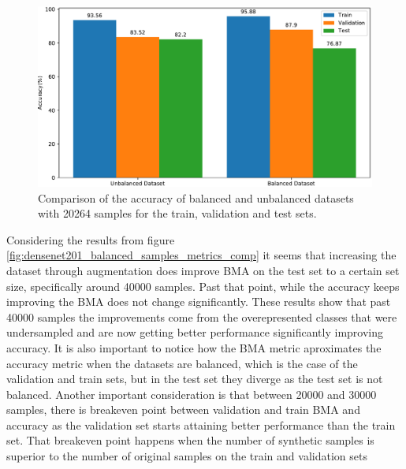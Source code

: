     \begin{figure}[ht]
        \centering
        \includegraphics[width=\textwidth]{figs/densenet201_acc_comp.pdf}
        \caption{Comparison of the accuracy of balanced and unbalanced datasets with 20264 samples for the train, validation and test sets.}
        \label{fig:densenet201_acc_comp}
    \end{figure}
    
    Considering the results from figure \ref{fig:densenet201_balanced_samples_metrics_comp} it seems that increasing the dataset through augmentation does improve BMA on the test set to a certain set size, specifically around 40000 samples. Past that point, while the accuracy keeps improving the BMA does not change significantly. These results show that past 40000 samples the improvements come from the overepresented classes that were undersampled and are now getting better performance significantly improving accuracy. It is also important to notice how the BMA metric aproximates the accuracy metric when the datasets are balanced, which is the case of the validation and train sets, but in the test set they diverge as the test set is not balanced. Another important consideration is that between 20000 and 30000 samples, there is breakeven point between validation and train BMA and accuracy as the validation set starts attaining better performance than the train set. That breakeven point happens when the number of synthetic samples is superior to the number of original samples on the train and validation sets  \par
    
